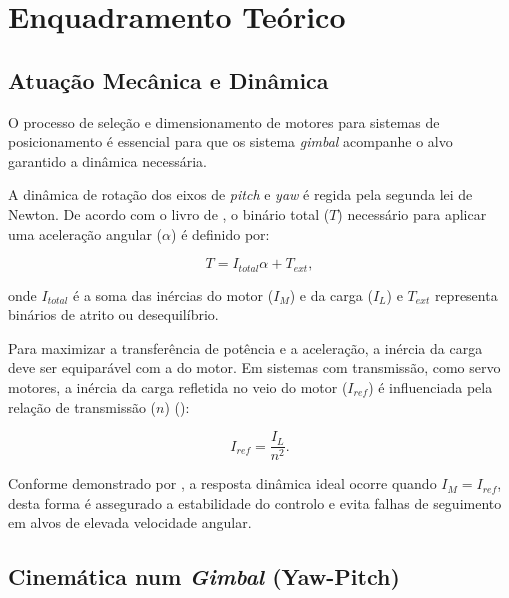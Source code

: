 % 
\chapter{Enquadramento Teórico} %
\label{chap:Enquadramento_Teorico} %

\section{Atuação Mecânica e Dinâmica}


O processo de seleção e dimensionamento de motores para sistemas de posicionamento é essencial para que os sistema \emph{gimbal} acompanhe o alvo garantido a dinâmica necessária.


A dinâmica de rotação dos eixos de \emph{pitch} e \emph{yaw} é regida pela segunda lei de Newton. De acordo com o livro de \cite{Handbook2007}, o binário total ($T$) necessário para aplicar uma aceleração angular ($\alpha$) é definido por:

\begin{equation}
    T = I_{total} \alpha + T_{ext},
\end{equation}

onde $I_{total}$ é a soma das inércias do motor ($I_M$) e da carga ($I_L$) e $T_{ext}$ representa binários de atrito ou desequilíbrio. 

Para maximizar a transferência de potência e a aceleração, a inércia da carga deve ser equiparável com a do motor. Em sistemas com transmissão, como servo motores, a inércia da carga refletida no veio do motor ($I_{ref}$) é influenciada pela relação de transmissão ($n$) (\cite{bolton2018}):

\begin{equation}
    I_{ref} = \frac{I_L}{n^2}.
\end{equation}

Conforme demonstrado por \cite{bolton2018}, a resposta dinâmica ideal ocorre quando $I_M = I_{ref}$, desta forma é assegurado a estabilidade do controlo e evita falhas de seguimento em alvos de elevada velocidade angular.

\section{Cinemática num \emph{Gimbal} (Yaw-Pitch)}


